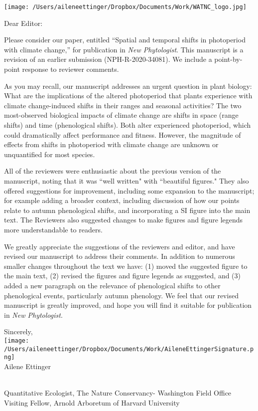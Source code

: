 \documentclass[11pt,a4paper]{letter}
\begin{document}
\begin{letter}{}
\texttt{[image: /Users/aileneettinger/Dropbox/Documents/Work/WATNC\_logo.jpg]}

\opening{Dear Editor:}
Please consider our paper, entitled ``Spatial and temporal shifts in photoperiod with climate change,'' for publication in  \emph{New Phytologist}. This manuscript is a revision of an earlier submission (NPH-R-2020-34081). We include a point-by-point response to reviewer comments.

\par As you may recall, our manuscript addresses an urgent question in plant biology: What are the implications
of the altered photoperiod that plants experience with climate change-induced shifts in their ranges and seasonal activities? The two most-observed biological impacts of climate change are shifts in space (range shifts) and time (phenological shifts). Both alter experienced photoperiod, which could dramatically affect performance and fitness. However, the magnitude of effects from shifts in photoperiod with climate change are unknown or unquantified for most species. 

\par All of the reviewers were enthusiastic about the previous version of the manuscript, noting that it was ``well written" with ``beautiful figures." They also offered suggestions for improvement, including some expansion to the manuscript; for example adding a broader context, including discussion of how our points relate to autumn phenological shifts, and incorporating a SI figure into the main text. The Reviewers also suggested changes to make figures and figure legends more understandable to readers. 
\par We greatly appreciate the suggestions of the reviewers and editor, and have revised our manuscript to address their comments. In addition to numerous smaller changes throughout the text we have: (1) moved the suggested figure to the main text, (2) revised the figures and figure legends as suggested, and (3) added a new paragraph on the relevance of phenological shifts to other phenological events, particularly autumn phenology. We feel that our revised manuscript is greatly improved, and hope you will find it suitable for publication in \emph{New Phytologist}.

\par Sincerely,\\

\texttt{[image: /Users/aileneettinger/Dropbox/Documents/Work/AileneEttingerSignature.png]} \\
Ailene Ettinger
\begin{footnotesize}\\
Quantitative Ecologist, The Nature Conservancy- Washington Field Office\\
Visiting Fellow, Arnold Arboretum of Harvard University 
\end{footnotesize}


\end{letter}
\end{document}
